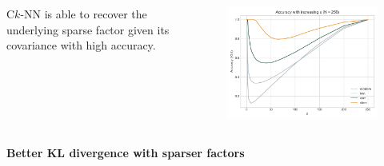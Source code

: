\documentclass{beamer}                             %
\newcommand{\blocktitle}[1]{{\Large \textbf{#1}}}
\begin{document}
\begin{frame}[t]
\begin{columns}[T]
\begin{column}{0.30\textwidth}
\begin{tcolorbox}
\begin{columns}
\begin{column}{0.5\textwidth}
        C\( k \)-NN is able to recover the underlying sparse
        factor given its covariance with high accuracy.
      \end{column}
      \begin{column}{0.5\textwidth}
        \begin{figure}[h!]
          \centering
          \includegraphics[width=\textwidth]{data/s_score.png}
        \end{figure}
      \end{column}
    \end{columns}
  \end{tcolorbox}

  \begin{tcolorbox}
    \blocktitle{Better KL divergence with sparser factors}


\end{tcolorbox}
\end{column}
\end{columns}
\end{frame}
\end{document}
